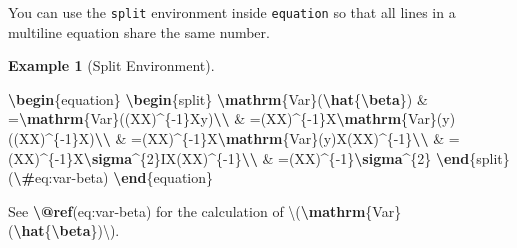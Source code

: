\documentclass[
]{article}
\newenvironment{Shaded}{\begin{snugshade}}{\end{snugshade}}
\newcommand{\ExtensionTok}[1]{#1}
\newcommand{\FunctionTok}[1]{\textcolor[rgb]{0.13,0.29,0.53}{\textbf{#1}}}
\newcommand{\KeywordTok}[1]{\textcolor[rgb]{0.13,0.29,0.53}{\textbf{#1}}}
\newcommand{\NormalTok}[1]{#1}
\newcommand{\SpecialCharTok}[1]{\textcolor[rgb]{0.81,0.36,0.00}{\textbf{#1}}}
\newcommand{\SpecialStringTok}[1]{\textcolor[rgb]{0.31,0.60,0.02}{#1}}
\numberwithin{equation}{section}
\numberwithin{figure}{section}
\theoremstyle{break}
\theoremstyle{definition}
\theoremstyle{definition}
\newtheorem{example}{Example}[section]
\theoremstyle{definition}
\theoremstyle{definition}
\theoremstyle{remark}
\begin{document}
You can use the \texttt{split} environment inside \texttt{equation} so that all lines in a multiline equation share the same number.

\begin{example}[Split Environment]
\leavevmode

\begin{Shaded}
\begin{Highlighting}[]
\KeywordTok{\textbackslash{}begin}\NormalTok{\{}\ExtensionTok{equation}\NormalTok{\}}\SpecialStringTok{ }
\KeywordTok{\textbackslash{}begin}\NormalTok{\{}\ExtensionTok{split}\NormalTok{\}}
\SpecialCharTok{\textbackslash{}mathrm}\SpecialStringTok{\{Var\}(}\SpecialCharTok{\textbackslash{}hat}\SpecialStringTok{\{}\SpecialCharTok{\textbackslash{}beta}\SpecialStringTok{\}) \& =}\SpecialCharTok{\textbackslash{}mathrm}\SpecialStringTok{\{Var\}((X\textquotesingle{}X)\^{}\{{-}1\}X\textquotesingle{}y)}\SpecialCharTok{\textbackslash{}\textbackslash{}}
\SpecialStringTok{ \& =(X\textquotesingle{}X)\^{}\{{-}1\}X\textquotesingle{}}\SpecialCharTok{\textbackslash{}mathrm}\SpecialStringTok{\{Var\}(y)((X\textquotesingle{}X)\^{}\{{-}1\}X\textquotesingle{})\textquotesingle{}}\SpecialCharTok{\textbackslash{}\textbackslash{}}
\SpecialStringTok{ \& =(X\textquotesingle{}X)\^{}\{{-}1\}X\textquotesingle{}}\SpecialCharTok{\textbackslash{}mathrm}\SpecialStringTok{\{Var\}(y)X(X\textquotesingle{}X)\^{}\{{-}1\}}\SpecialCharTok{\textbackslash{}\textbackslash{}}
\SpecialStringTok{ \& =(X\textquotesingle{}X)\^{}\{{-}1\}X\textquotesingle{}}\SpecialCharTok{\textbackslash{}sigma}\SpecialStringTok{\^{}\{2\}IX(X\textquotesingle{}X)\^{}\{{-}1\}}\SpecialCharTok{\textbackslash{}\textbackslash{}}
\SpecialStringTok{ \& =(X\textquotesingle{}X)\^{}\{{-}1\}}\SpecialCharTok{\textbackslash{}sigma}\SpecialStringTok{\^{}\{2\}}
\KeywordTok{\textbackslash{}end}\NormalTok{\{}\ExtensionTok{split}\NormalTok{\}}
\SpecialStringTok{(}\SpecialCharTok{\textbackslash{}\#}\SpecialStringTok{eq:var{-}beta)}
\KeywordTok{\textbackslash{}end}\NormalTok{\{}\ExtensionTok{equation}\NormalTok{\} }

\NormalTok{See }\FunctionTok{\textbackslash{}@ref}\NormalTok{(eq:var{-}beta) for the calculation of }\SpecialStringTok{\textbackslash{}(}\SpecialCharTok{\textbackslash{}mathrm}\SpecialStringTok{\{Var\}(}\SpecialCharTok{\textbackslash{}hat}\SpecialStringTok{\{}\SpecialCharTok{\textbackslash{}beta}\SpecialStringTok{\})\textbackslash{})}\NormalTok{.}
\end{Highlighting}
\end{Shaded}


\end{example}
\end{document}
